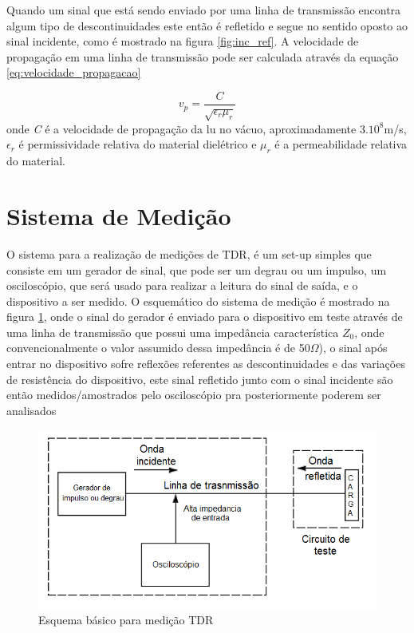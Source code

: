 Quando um sinal que está sendo enviado por uma linha de transmissão encontra algum tipo de descontinuidades este então é refletido e segue no sentido oposto ao sinal incidente, como é mostrado na figura \ref{fig:inc_ref}. A velocidade de propagação em uma linha de transmissão pode ser calculada através da equação \ref{eq:velocidade_propagacao}

\begin{equation}
	v_p = \frac{C}{\sqrt{\epsilon_r \mu_r}}
	\label{eq:velocidade_propagacao}
\end{equation}
\noindent
onde \emph{C} é a velocidade de propagação da lu no vácuo, aproximadamente $3.10^8$m/s, $\epsilon_r$ é permissividade relativa do material dielétrico e $\mu_r$ é a permeabilidade relativa do material.

\section{Sistema de Medição}
O sistema para a realização de medições de TDR, é um set-up simples que consiste em um gerador de sinal, que pode ser um degrau ou um impulso, um osciloscópio, que será usado para realizar a leitura do sinal de saída, e o dispositivo a ser medido. O esquemático do sistema de medição é mostrado na figura \ref{fig:circuito_TDR}, onde o sinal do gerador é enviado para o dispositivo em teste através de uma linha de transmissão que possui uma impedância característica $Z_0$, onde convencionalmente o valor assumido dessa impedância é de 50$\Omega$), o sinal após entrar no dispositivo sofre reflexões referentes as descontinuidades e das variações de resistência do dispositivo, este sinal refletido junto com o sinal incidente são então medidos/amostrados pelo osciloscópio pra posteriormente poderem ser analisados

\begin{figure}[htb!]
	\begin{center}
		\includegraphics[scale=.6]{./cap2/figuras/simple_TDR.png}
		\caption{Esquema básico para medição TDR}
		\label{fig:circuito_TDR}
	\end{center}
\end{figure}

